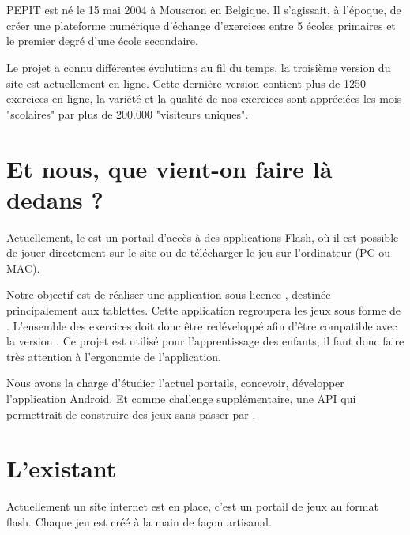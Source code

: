 \section{\pepit}
PEPIT est né le 15 mai 2004 à Mouscron en Belgique. Il s'agissait, à l'époque, de créer une plateforme numérique d'échange d'exercices entre 5 écoles primaires et le premier degré d'une école secondaire.


Le projet a connu différentes évolutions au fil du temps, la troisième version du site est actuellement en ligne. Cette dernière version contient plus de 1250 exercices en ligne, la variété et la qualité de nos exercices sont appréciées les mois "scolaires" par plus de 200.000 "visiteurs uniques".
\section{Et nous, que vient-on faire là dedans ?}
Actuellement, le \pepitSite{} est un portail d'accès à des applications Flash, où il est possible de jouer directement sur le site ou de télécharger le jeu sur l'ordinateur (PC ou MAC).

Notre objectif est de réaliser une application \android{} sous licence \licenceDuProjet{}, destinée principalement aux tablettes. Cette application regroupera les jeux sous forme de \plugin{}. L'ensemble des exercices doit donc être redéveloppé afin d'être compatible avec la version \android{}.
Ce projet est utilisé pour l'apprentissage des enfants, il faut donc faire très attention à l'ergonomie de l'application.

Nous avons la charge d'étudier l'actuel portails, concevoir, développer l'application Android. Et comme challenge supplémentaire, une API qui permettrait de construire des jeux sans passer par \java{}.


\section{L'existant}
Actuellement un site internet est en place, c'est un portail de jeux au format flash. Chaque jeu est créé à la main de façon artisanal.

